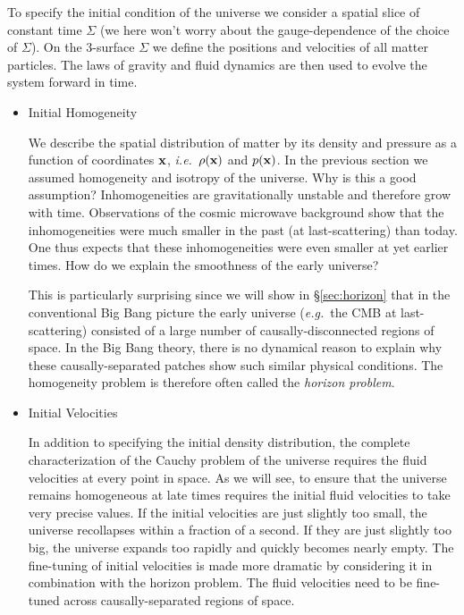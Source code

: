 \documentclass[12pt,letterpaper,rotate]{article}
\begin{document}
{To specify the initial condition of the universe we consider a spatial slice of constant time $\Sigma$ (we here won't worry about the gauge-dependence of the choice of $\Sigma$).
On the 3-surface $\Sigma$ we define the positions and velocities of all matter particles.
The laws of gravity and fluid dynamics are then used to evolve the system forward in time.


\begin{itemize}
\item Initial Homogeneity

We describe the spatial distribution of matter by its density and pressure as a function of coordinates ${\bf x}$, {\it i.e.}~$\rho({\bf x})$ and $p({\bf x})$.
In the previous section we assumed homogeneity and isotropy of the universe. Why is this a good assumption? %
Inhomogeneities are gravitationally
unstable and therefore grow with time. Observations of the cosmic microwave background 
show that the inhomogeneities were 
much smaller in the past (at last-scattering) than today. One thus expects that 
these inhomogeneities were even smaller at yet earlier times.
How do we explain the smoothness of the early universe?

This is particularly surprising since we will show in \S\ref{sec:horizon} that in the conventional Big Bang picture the early universe ({\it e.g.}~the CMB at last-scattering) consisted of a large number of causally-disconnected regions of space.  In the Big Bang theory, there is no dynamical reason to explain why these causally-separated patches show such similar physical conditions.
The homogeneity problem is therefore often called the
{\it horizon problem}.

\item Initial Velocities

In addition to specifying the initial density distribution, the complete characterization of the Cauchy problem of the universe requires the fluid velocities at every point in space.
As we will see, to ensure that the universe remains homogeneous at late times requires the initial fluid velocities to take very precise values.
If the initial velocities are just slightly too small, the universe recollapses within a fraction of a second.
If they are just slightly too big, the universe expands too rapidly and quickly becomes nearly empty.
The fine-tuning of initial velocities is made more dramatic by considering it in combination with the horizon problem. The fluid velocities need to be fine-tuned across causally-separated regions of space.


\end{itemize}}
\end{document}
